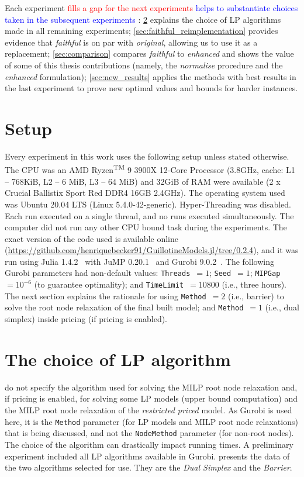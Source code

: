 \documentclass[ppgc,tese,english,formais,babel]{iiufrgs}
\newif\iffinalversion
\newcommand{\newtext}[1]{\iffinalversion%
#1%
\else%
\textcolor{blue}{#1}%
\fi%
}
\newcommand{\oldtext}[1]{\iffinalversion%
\else%
\textcolor{red}{#1}%
\fi%
}
\begin{document}
Each experiment \oldtext{fills a gap for the next experiments}\newtext{helps to substantiate choices taken in the subsequent experiments}:
\cref{sec:lp_method} explains the choice of LP algorithms made in all remaining experiments;
\cref{sec:faithful_reimplementation} provides evidence that \emph{faithful} is on par with \emph{original}, allowing us to use it as a replacement;
\cref{sec:comparison} compares \emph{faithful} to \emph{enhanced} and shows the value of some of this thesis contributions (namely, the \emph{normalise} procedure and the \emph{enhanced} formulation);
\cref{sec:new_results} applies the methods with best results in the last experiment to prove new optimal values and bounds for harder instances.

\section{Setup}
\label{sec:setup}

Every experiment in this work uses the following setup unless stated otherwise.
The CPU was an AMD\textsuperscript{\textregistered} Ryzen\textsuperscript{TM} 9 3900X 12-Core Processor (3.8GHz, cache: L1 -- 768KiB, L2 -- 6 MiB, L3 -- 64 MiB) and 32GiB of RAM were available (2 x Crucial Ballistix Sport Red DDR4 16GB 2.4GHz).
The operating system used was Ubuntu 20.04 LTS (Linux 5.4.0-42-generic).
Hyper-Threading was disabled.
Each run executed on a single thread, and no runs executed simultaneously.
The computer did not run any other CPU bound task during the experiments.
The exact version of the code used is available online (\url{https://github.com/henriquebecker91/GuillotineModels.jl/tree/0.2.4}), and it was run using Julia 1.4.2~\citep{julia} with JuMP 0.20.1~\citep{JuMP} and Gurobi 9.0.2~\citep{gurobi}.
The following Gurobi parameters had non-default values: \verb+Threads+~\(= 1\); \verb+Seed+~\(= 1\); \verb+MIPGap+~\(= 10^{-6}\) (to guarantee optimality); and \verb+TimeLimit+~\(= 10800\) (i.e., three hours).
The next section explains the rationale for using \verb+Method+~\(= 2\) (i.e., barrier) to solve the root node relaxation of the final built model; and \verb+Method+~\(= 1\) (i.e., dual simplex) inside pricing (if pricing is enabled).

\section{The choice of LP algorithm}
\label{sec:lp_method}

\citet{dimitri_thesis} do not specify the algorithm used for solving the MILP root node relaxation and, if pricing is enabled, for solving some LP models (upper bound computation) and the MILP root node relaxation of the \emph{restricted priced} model.
As Gurobi is used here, it is the \verb+Method+ parameter (for LP models and MILP root node relaxations) that is being discussed, and not the \verb+NodeMethod+ parameter (for non-root nodes).
The choice of the algorithm can drastically impact running times.
A preliminary experiment included all LP algorithms available in Gurobi.
 presents the data of the two algorithms selected for use.
They are the \emph{Dual Simplex} and the \emph{Barrier}.
\end{document}
